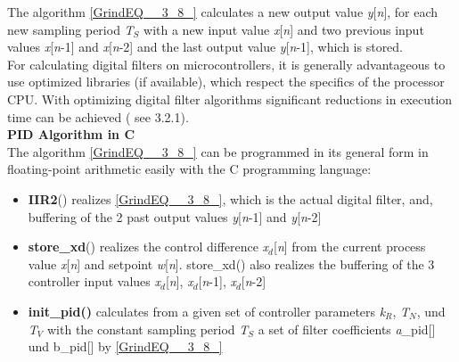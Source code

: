 The algorithm \eqref{GrindEQ__3_8_} calculates a new output value \textit{y}[\textit{n}], for each new sampling period \textit{T${}_{S}$} with a new input value \textit{x}[\textit{n}] and two previous input values \textit{x}[\textit{n}-1] and \textit{x}[\textit{n}-2] and the last output value \textit{y}[\textit{n}-1], which is stored.\\

For calculating digital filters on microcontrollers, it is generally advantageous to use optimized libraries (if available), which respect the specifics of the processor CPU. With optimizing digital filter algorithms significant reductions in execution time can be achieved ( see 3.2.1).\\

{\rot\bf PID Algorithm in C }\\

The algorithm \eqref{GrindEQ__3_8_} can be programmed in its general form in floating-point arithmetic easily with the C programming language:\\

\begin{itemize}
\item  \textbf{IIR2}() realizes \eqref{GrindEQ__3_8_}, which is the actual digital filter, and, buffering of the 2 past output values \textit{y}[\textit{n}-1] and \textit{y}[\textit{n}-2]

\item  \textbf{store\_xd}() realizes the control difference \textit{x${}_{d}$}[\textit{n}] from the current process value \textit{x}[\textit{n}] and setpoint \textit{w}[\textit{n}]. store\_xd() also realizes the buffering of the 3 controller input values \textit{x${}_{d}$}[\textit{n}], \textit{x${}_{d}$}[\textit{n}-1], \textit{x${}_{d}$}[\textit{n}-2]

\item  \textbf{init\_pid()} calculates from a given set of controller parameters \textit{k${}_{R}$}, \textit{T${}_{N}$}, und \textit{T${}_{V}$} with the constant sampling period \textit{T${}_{S}$} a set of filter coefficients \textit{a\_}pid[] und  b\_pid[] by \eqref{GrindEQ__3_8_}
\end{itemize}

